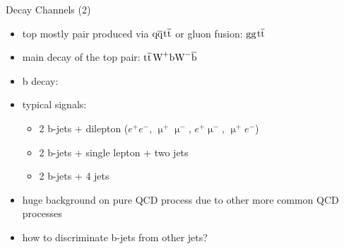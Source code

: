 \begin{frame}{Decay Channels (2)}

	\begin{itemize}\itemfill
		\item top mostly pair produced via $\text{q}\overline{\text{q}}$\ch{->}$\text{t}\overline{\text{t}}$ or gluon fusion: $\text{g}\text{g}$\ch{->}$\text{t}\overline{\text{t}}$  
		\item main decay of the top pair: $\text{t}\overline{\text{t}}$\ch{->}$\text{W}^+\text{b}\text{W}^-\overline{\text{b}}$
		\item b decay:
	\end{itemize}
	
	\begin{figure}\vspace*{-10pt}
		\centering
		\hspace*{10pt}
	\end{figure}
	
	\begin{itemize}\itemfill
		\item typical signals:
		\begin{itemize}
			\item 2 b-jets + dilepton ($e^+e^-$, $\upmu^+\upmu^-$, $e^+\upmu^-$, $\upmu^+e^-$)
			\item 2 b-jets + single lepton + two jets
			\item 2 b-jets + 4 jets
		\end{itemize}
		\item huge background on pure QCD process due to other more common QCD processes
		\item how to discriminate b-jets from other jets?
	\end{itemize}

\end{frame}
